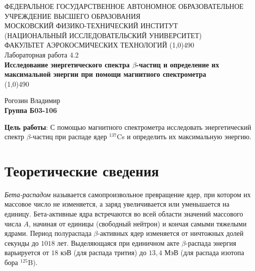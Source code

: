 \documentclass[a4paper,12pt]{article}
\begin{document}
\begin{titlepage}
\begin{center}
\large{\small ФЕДЕРАЛЬНОЕ ГОСУДАРСТВЕННОЕ АВТОНОМНОЕ ОБРАЗОВАТЕЛЬНОЕ\\ УЧРЕЖДЕНИЕ ВЫСШЕГО ОБРАЗОВАНИЯ \\ МОСКОВСКИЙ ФИЗИКО-ТЕХНИЧЕСКИЙ ИНСТИТУТ\\ (НАЦИОНАЛЬНЫЙ ИССЛЕДОВАТЕЛЬСКИЙ УНИВЕРСИТЕТ)\\ ФАКУЛЬТЕТ АЭРОКОСМИЧЕСКИХ ТЕХНОЛОГИЙ}
\vfill
\line(1,0){490}\\[1mm]
\huge{Лабораторная работа 4.2}\\
\huge\textbf{Исследование энергетического спектра $\beta$-частиц и определение их максимальной энергии при помощи магнитного спектрометра}\\
\line(1,0){490}\\[1mm]
\vfill
\begin{flushright}
\normalsize{Рогозин Владимир}\\
\normalsize{\textbf{Группа Б03-106}}\\
\end{flushright}
\end{center}
\end{titlepage}

\textbf{Цель работы}:
С помощью магнитного спектрометра исследовать энергетический спектр $\beta$-частиц при распаде ядер ${}^{137}$Cs и определить их максимальную энергию.




\section{Теоретические сведения}
\textit{Бета-распадом} называется самопроизвольное превращение ядер, при котором их массовое число не изменяется, а заряд увеличивается или уменьшается на единицу. Бета-активные ядра встречаются во всей области значений массового числа $A$, начиная от единицы (свободный нейтрон) и кончая самыми тяжелыми ядрами. Период полураспада $\beta$-активных ядер изменяется от ничтожных долей секунды до $1018$ лет. Выделяющаяся при единичном акте $\beta$-распада энергия варьируется от $18$ кэВ (для распада трития) до $13,4$ МэВ (для распада
изотопа бора ${}^{125}$B).
\end{document}
